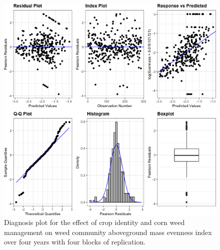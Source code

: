 \documentclass[
]{article}
\begin{document}
\begin{figure}
\centering
\includegraphics{AppendixA-model-diagnosis_files/figure-latex/biom-even-mod-1.png}
\caption{\label{fig:biom-even-mod}Diagnosis plot for the effect of crop identity and corn weed management on weed community aboveground mass evenness index over four years with four blocks of replication.}
\end{figure}
\end{document}
